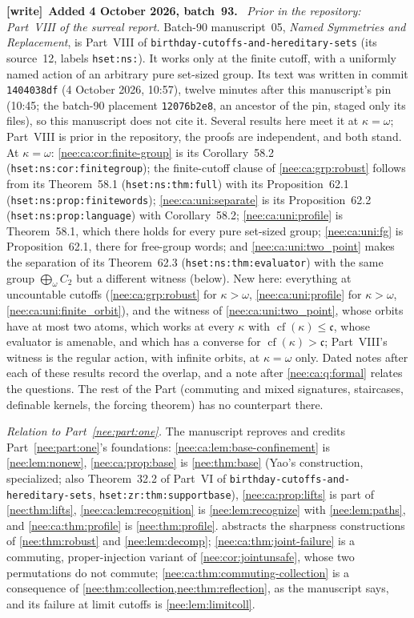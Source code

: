 \documentclass[11pt,letterpaper]{article}
\numberwithin{equation}{section}
\theoremstyle{plain}
\theoremstyle{definition}
\theoremstyle{remark}
\newcommand{\cf}{\operatorname{cf}}
\newcommand{\cont}{\mathfrak c}
\newenvironment{writenote}[1][]{\par\smallskip\begingroup\small\raggedright
 \setlength{\parindent}{1.25em}\noindent\textbf{[write]}\if\relax\detokenize{#1}\relax\else~\textbf{#1.}\fi\ }%
 {\par\endgroup\smallskip}
\begin{document}
\begin{writenote}[Added 4 October 2026, batch~93]
\emph{Prior in the repository: Part~VIII of the surreal report.} Batch-90 manuscript~05, \emph{Named Symmetries and Replacement}, is Part~VIII of \nolinkurl{birthday-cutoffs-and-hereditary-sets} (its source~12, labels \texttt{hset:ns:}). It works only at the finite cutoff, with a uniformly named action of an arbitrary pure set-sized group. Its text was written in commit \texttt{1404038df} (4 October 2026, 10:57), twelve minutes after this manuscript's pin (10:45; the batch-90 placement \texttt{12076b2e8}, an ancestor of the pin, staged only its files), so this manuscript does not cite it. Several results here meet it at $\kappa=\omega$; Part~VIII is prior in the repository, the proofs are independent, and both stand. At $\kappa=\omega$: \cref{nee:ca:cor:finite-group} is its Corollary~58.2 (\texttt{hset:ns:cor:finitegroup}); the finite-cutoff clause of \cref{nee:ca:grp:robust} follows from its Theorem~58.1 (\texttt{hset:ns:thm:full}) with its Proposition~62.1 (\texttt{hset:ns:prop:finitewords}); \cref{nee:ca:uni:separate} is its Proposition~62.2 (\texttt{hset:ns:prop:language}) with Corollary~58.2; \cref{nee:ca:uni:profile} is Theorem~58.1, which there holds for every pure set-sized group; \cref{nee:ca:uni:fg} is Proposition~62.1, there for free-group words; and \cref{nee:ca:uni:two_point} makes the separation of its Theorem~62.3 (\texttt{hset:ns:thm:evaluator}) with the same group $\bigoplus_\omega C_2$ but a different witness (below). New here: everything at uncountable cutoffs (\cref{nee:ca:grp:robust} for $\kappa>\omega$, \cref{nee:ca:uni:profile} for $\kappa>\omega$, \cref{nee:ca:uni:finite_orbit}), and the witness of \cref{nee:ca:uni:two_point}, whose orbits have at most two atoms, which works at every $\kappa$ with $\cf(\kappa)\leq\cont$, whose evaluator is amenable, and which has a converse for $\cf(\kappa)>\cont$; Part~VIII's witness is the regular action, with infinite orbits, at $\kappa=\omega$ only. Dated notes after each of these results record the overlap, and a note after \cref{nee:ca:q:formal} relates the questions. The rest of the Part (commuting and mixed signatures, staircases, definable kernels, the forcing theorem) has no counterpart there.

\emph{Relation to Part~\ref{nee:part:one}.} The manuscript reproves and credits Part~\ref{nee:part:one}'s foundations: \cref{nee:ca:lem:base-confinement} is \cref{nee:lem:nonew}, \cref{nee:ca:prop:base} is \cref{nee:thm:base} (Yao's construction, specialized; also Theorem~32.2 of Part~VI of \nolinkurl{birthday-cutoffs-and-hereditary-sets}, \texttt{hset:zr:thm:supportbase}), \cref{nee:ca:prop:lifts} is part of \cref{nee:thm:lifts}, \cref{nee:ca:lem:recognition} is \cref{nee:lem:recognize} with \cref{nee:lem:paths}, and \cref{nee:ca:thm:profile} is \cref{nee:thm:profile}.  abstracts the sharpness constructions of \cref{nee:thm:robust} and \cref{nee:lem:decomp}; \cref{nee:ca:thm:joint-failure} is a commuting, proper-injection variant of \cref{nee:cor:jointunsafe}, whose two permutations do not commute; \cref{nee:ca:thm:commuting-collection} is a consequence of \cref{nee:thm:collection,nee:thm:reflection}, as the manuscript says, and its failure at limit cutoffs is \cref{nee:lem:limitcoll}.


\end{writenote}
\end{document}
